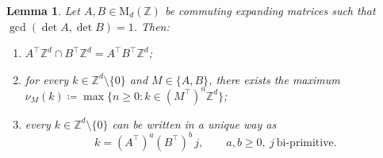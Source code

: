 \documentclass[11pt,reqno]{amsart}
\theoremstyle{plain}
\newtheorem{lem}[thm]{Lemma}
\theoremstyle{definition}
\newcommand{\Z}{\mathbb{Z}}
\begin{document}
\begin{lem}
    \label{lem:freeness}
    Let \( A,B\in \mathrm{M}_d(\Z) \) be commuting expanding matrices such that \( \gcd(\det A,\det B)=1 \).
    Then:
    \begin{enumerate}
        \item\label{item:intersection}
            \( A^{\top}\Z^d\cap B^{\top}\Z^d=A^{\top}B^{\top}\Z^d \);
        \item\label{item:finite}
            for every \( k\in\Z^d\setminus\{0\} \) and \(M \in \{A,B\}\), there exists the maximum \(\nu_M(k) \coloneqq \max\{n\ge0:k\in(M^{\top})^{n}\Z^d\} \);
        \item\label{item:unique}
            every \( k\in\Z^d\setminus\{0\} \) can be written in a unique way as
            \[
                k=(A^{\top})^{a}(B^{\top})^{b}\,j,\qquad a,b\ge0,\ j\ \text{bi-primitive}.
            \]
    \end{enumerate}
\end{lem}
\end{document}
